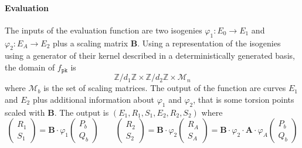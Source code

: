 \documentclass[12pt,a4paper]{article}
\begin{document}
		\paragraph{Evaluation} The inputs of the evaluation function are two isogenies
		$\varphi_1:E_0\to E_1$ and $\varphi_2:E_A\to E_2$ plus a scaling matrix $\mathbf B$.
		Using a representation of the isogenies using a generator of their kernel described
		in a deterministically generated basis, the domain of $f_\mathtt{pk}$ is
		$$\mathbb{Z}/d_1\mathbb{Z}\times\mathbb{Z}/d_2\mathbb{Z}\times\mathcal M_n$$
		where $\mathcal M_b$ is the set of scaling matrices.
		The output of the function are curves $E_1$ and $E_2$ plus additional information
		about $\varphi_1$ and $\varphi_2$, that is some torsion points scaled with $\mathbf B$.
		The output is $(E_1,R_1,S_1,E_2,R_2,S_2)$ where
		\[
			\begin{pmatrix} R_1 \\ S_1 \end{pmatrix} = \mathbf B \cdot \varphi_1 
			\begin{pmatrix} P_b \\ Q_b \end{pmatrix}\quad\quad
			\begin{pmatrix} R_2 \\ S_2 \end{pmatrix} = \mathbf B \cdot\varphi_2
			\begin{pmatrix} R_A \\ S_A \end{pmatrix} = \mathbf B\cdot\varphi_2\cdot\mathbf A
			\cdot\varphi_A \begin{pmatrix} P_b \\ Q_b \end{pmatrix} 
		\] 
\end{document}
